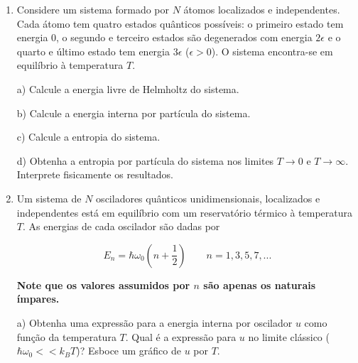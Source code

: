 \begin{enumerate}[start=1,label={\bfseries Q\arabic*.}]
  \resposta



\item Considere um sistema formado por $N$ átomos localizados e independentes. Cada átomo tem quatro estados quânticos possíveis: o primeiro estado tem energia 0, o segundo e terceiro estados são degenerados com energia $2\epsilon$ e o quarto e último estado tem energia $3\epsilon$ ($\epsilon > 0$). O sistema encontra-se em equilíbrio à temperatura $T$.


a) Calcule a energia livre de Helmholtz do sistema.

\resposta

b) Calcule a energia interna por partícula do sistema.

\resposta

c) Calcule a entropia do sistema.

\resposta

d) Obtenha a entropia por partícula do sistema nos limites $T \rightarrow 0$ e $T \rightarrow \infty$. Interprete fisicamente os resultados.

\resposta




\item Um sistema de $N$ osciladores quânticos unidimensionais, localizados e independentes está em equilíbrio com um reservatório térmico à temperatura $T$. As energias de cada oscilador são dadas por

$$
E_{n} = \hbar \omega_{0} \left(  n + \frac{1}{2} \right)   \quad \quad n = 1,3,5,7,...
$$


\textbf{Note que os valores assumidos por $n$ são apenas os naturais ímpares.}


a) Obtenha uma expressão para a energia interna por oscilador $u$ como função da temperatura $T$. Qual é a expressão para $u$ no limite clássico ($\hbar \omega_{0} << k_{B}T$)? Esboce um gráfico de $u$ por $T$.


\end{enumerate}

